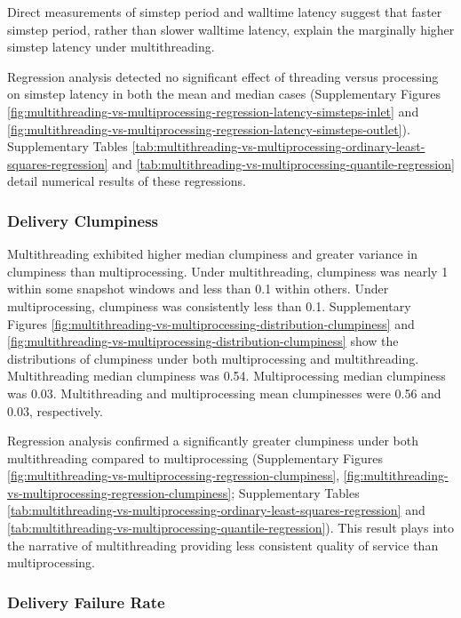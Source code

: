 Direct measurements of simstep period and walltime latency suggest that faster simstep period, rather than slower walltime latency, explain the marginally higher simstep latency under multithreading.

Regression analysis detected no significant effect of threading versus processing on simstep latency in both the mean and median cases (Supplementary Figures \ref{fig:multithreading-vs-multiprocessing-regression-latency-simsteps-inlet} and \ref{fig:multithreading-vs-multiprocessing-regression-latency-simsteps-outlet}).
Supplementary Tables \ref{tab:multithreading-vs-multiprocessing-ordinary-least-squares-regression} and \ref{tab:multithreading-vs-multiprocessing-quantile-regression} detail numerical results of these regressions.

\subsubsection{Delivery Clumpiness}

Multithreading exhibited higher median clumpiness and greater variance in clumpiness than multiprocessing.
Under multithreading, clumpiness was nearly 1 within some snapshot windows and less than 0.1 within others.
Under multiprocessing, clumpiness was consistently less than 0.1.
Supplementary Figures \ref{fig:multithreading-vs-multiprocessing-distribution-clumpiness} and \ref{fig:multithreading-vs-multiprocessing-distribution-clumpiness} show the distributions of clumpiness under both multiprocessing and multithreading.
Multithreading median clumpiness was 0.54.
Multiprocessing median clumpiness was 0.03.
Multithreading and multiprocessing mean clumpinesses were 0.56 and 0.03, respectively.

Regression analysis confirmed a significantly greater clumpiness under both multithreading compared to multiprocessing (Supplementary Figures \ref{fig:multithreading-vs-multiprocessing-regression-clumpiness}, \ref{fig:multithreading-vs-multiprocessing-regression-clumpiness}; Supplementary Tables \ref{tab:multithreading-vs-multiprocessing-ordinary-least-squares-regression} and \ref{tab:multithreading-vs-multiprocessing-quantile-regression}).
This result plays into the narrative of multithreading providing less consistent quality of service than multiprocessing.

\subsubsection{Delivery Failure Rate}

